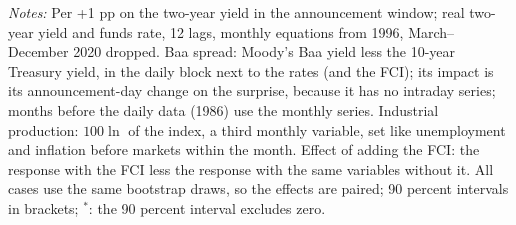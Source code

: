 \begin{table}[tp]\centering\small
\caption{Credit, Activity and the Effect of Adding the FCI (Real Rates; 24 Months)}\label{tab:credit}
\begin{flushleft}\footnotesize\textit{Notes:} Per +1 pp on the two-year yield in the announcement window; real two-year yield and funds rate, 12 lags, monthly equations from 1996, March--December 2020 dropped. Baa spread: Moody's Baa yield less the 10-year Treasury yield, in the daily block next to the rates (and the FCI); its impact is its announcement-day change on the surprise, because it has no intraday series; months before the daily data (1986) use the monthly series. Industrial production: $100\ln$ of the index, a third monthly variable, set like unemployment and inflation before markets within the month. Effect of adding the FCI: the response with the FCI less the response with the same variables without it. All cases use the same bootstrap draws, so the effects are paired; 90 percent intervals in brackets; $^{*}$: the 90 percent interval excludes zero.\end{flushleft}
\end{table}
